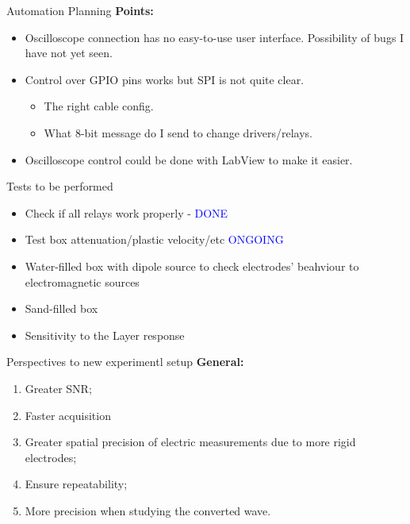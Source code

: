 \documentclass[utf8]{beamer} \usetheme{lfcr} %
\begin{document}
\begin{frame}{Automation Planning}
  \textbf{Points:}
  \begin{itemize}
    \item {Oscilloscope connection has no easy-to-use user interface.
      Possibility of bugs I have not yet seen.}
    \item {Control over GPIO pins works but SPI is not quite clear.
      \begin{itemize}
        \item {The right cable config.}
        \item {What 8-bit message do I send to change drivers/relays.}
      \end{itemize}}
    \item {Oscilloscope control could be done with LabView to make it easier.}
  \end{itemize}
\end{frame}
%
\begin{frame}{Tests to be performed}
  \begin{itemize}
    \item Check if all relays work properly - \textcolor{blue}{DONE}
    \item Test box attenuation/plastic velocity/etc \textcolor{blue}{ONGOING}
    \item Water-filled box with dipole source to check electrodes' beahviour to
      electromagnetic sources
    \item Sand-filled box
    \item Sensitivity to the Layer response
  \end{itemize}
\end{frame}
%
\begin{frame}{Perspectives to new experimentl setup}
  \textbf{General:}
  \begin{enumerate}
    \item Greater SNR;
    \item Faster acquisition
    \item Greater spatial precision of electric measurements due to more rigid
      electrodes;
    \item Ensure repeatability;
    \item More precision when studying the converted wave.
  \end{enumerate}
\end{frame}
  
\end{document}
